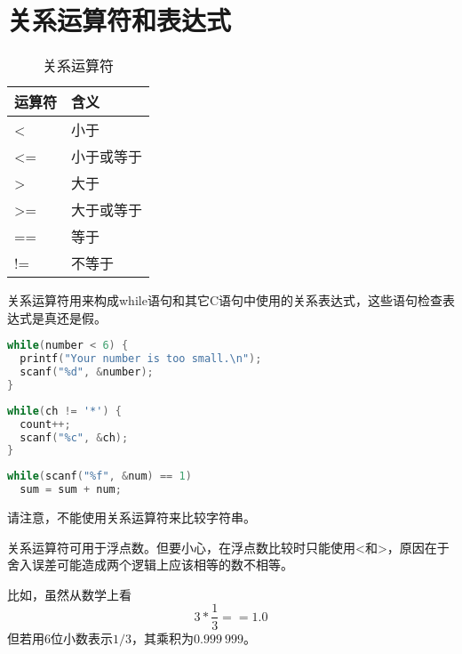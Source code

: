 \section{关系运算符和表达式}

\begin{frame}[fragile]\ft{\secname}
\begin{table}
\centering
\caption{关系运算符}
\begin{tabular}{p{2cm}|p{3cm}}\hline
运算符& 含义\\\hline\hline
<  & 小于\\[0.1in]
<= & 小于或等于\\[0.1in]
>  & 大于\\[0.1in]
>= & 大于或等于\\[0.1in]
== & 等于\\[0.1in]
!= & 不等于\\\hline
\end{tabular}
\end{table}
\end{frame}

\begin{frame}[fragile]\ft{\secname}
关系运算符用来构成while语句和其它C语句中使用的关系表达式，这些语句检查表达式是真还是假。
\end{frame}

\begin{frame}[fragile]\ft{\secname}
\begin{lstlisting}[language=c]
while(number < 6) {
  printf("Your number is too small.\n");
  scanf("%d", &number);
}
\end{lstlisting}
\begin{lstlisting}[language=c]
while(ch != '*') {
  count++;
  scanf("%c", &ch);  
}
\end{lstlisting}

\begin{lstlisting}[language=c]
while(scanf("%f", &num) == 1)
  sum = sum + num;
\end{lstlisting}

\end{frame}

\begin{frame}[fragile]\ft{\secname}
请注意，不能使用关系运算符来比较字符串。
\end{frame}

\begin{frame}[fragile]\ft{\secname}
关系运算符可用于浮点数。但要小心，在浮点数比较时只能使用<和>，原因在于舍入误差可能造成两个逻辑上应该相等的数不相等。\vspace{0.1in}

比如，虽然从数学上看
$$
3*\frac13==1.0
$$
但若用6位小数表示$1/3$，其乘积为$0.999~999$。
\end{frame}

